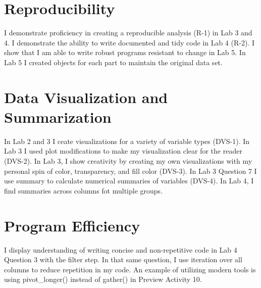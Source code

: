 \documentclass[
  letterpaper,
  DIV=11,
  numbers=noendperiod]{scrartcl}
\begin{document}
\hypertarget{reproducibility}{%
\section{Reproducibility}\label{reproducibility}}

I demonstrate proficiency in creating a reproducible analysis (R-1) in
Lab 3 and 4. I demonstrate the ability to write documented and tidy code
in Lab 4 (R-2). I show that I am able to write robust programs resistant
to change in Lab 5. In Lab 5 I created objects for each part to maintain
the original data set.

\hypertarget{data-visualization-and-summarization}{%
\section{Data Visualization and
Summarization}\label{data-visualization-and-summarization}}

In Lab 2 and 3 I ceate visualizations for a variety of variable types
(DVS-1). In Lab 3 I used plot modifications to make my visualization
clear for the reader (DVS-2). In Lab 3, I show creativity by creating my
own visualizations with my personal spin of color, transparency, and
fill color (DVS-3). In Lab 3 Question 7 I use summary to calculate
numerical summaries of variables (DVS-4). In Lab 4, I find summaries
across columns fot multiple groups.

\hypertarget{program-efficiency}{%
\section{Program Efficiency}\label{program-efficiency}}

I display understanding of writing concise and non-repetitive code in
Lab 4 Question 3 with the filter step. In that same question, I use
iteration over all columns to reduce repetition in my code. An example
of utilizing modern tools is using pivot\_longer() instead of gather()
in Preview Activity 10.
\end{document}
